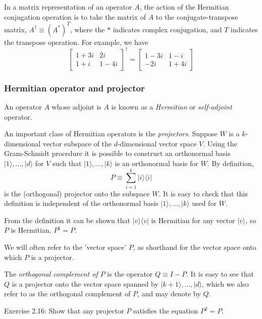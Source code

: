 In a matrix representation of an operator $A$, the action of the Hermitian conjugation operation is to take the matrix of $A$ to the conjugate-transpose matrix, $A^{\dagger} \equiv\left(A^{*}\right)^{T}$, where the $*$ indicates complex conjugation, and $T$ indicates the transpose operation. For example, we have
$$
\left[\begin{array}{cc}
1+3 i & 2 i \\
1+i & 1-4 i
\end{array}\right]^{\dagger}=\left[\begin{array}{cc}
1-3 i & 1-i \\
-2 i & 1+4 i
\end{array}\right]
$$

\subsubsection{Hermitian operator and projector}

An operator $A$ whose adjoint is $A$ is known as a \textit{Hermitian} or \textit{self-adjoint} operator. 

An important class of Hermitian operators is the \textit{projectors}. Suppose $W$ is a $k$-dimensional vector subspace of the $d$-dimensional vector space $V$. Using the Gram-Schmidt procedure it is possible to construct an orthonormal basis $|1\rangle, \ldots,|d\rangle$ for $V$ such that $|1\rangle, \ldots,|k\rangle$ is an orthonormal basis for $W$. By definition,
$$
P \equiv \sum_{i=1}^{k}|i\rangle\langle i|
$$
is the (orthogonal) projector onto the subspace $W$. It is easy to check that this definition is independent of the orthonormal basis $|1\rangle, \ldots,|k\rangle$ used for $W$. 

From the definition it can be shown that $|v\rangle\langle v|$ is Hermitian for any vector $|v\rangle$, so $P$ is Hermitian, $P^{\dagger}=P$. 

\begin{remark} %
    We will often refer to the 'vector space' $P$, as shorthand for the vector space onto which $P$ is a projector. 
\end{remark}

The \textit{orthogonal complement of $P$} is the operator $Q \equiv I-P$. It is easy to see that $Q$ is a projector onto the vector space spanned by $|k+1\rangle, \ldots,|d\rangle$, which we also refer to as the orthogonal complement of $P$, and may denote by $Q$.

\begin{exercise}
    Exercise 2.16: Show that any projector $P$ satisfies the equation $P^{2}=P$.
\end{exercise}

